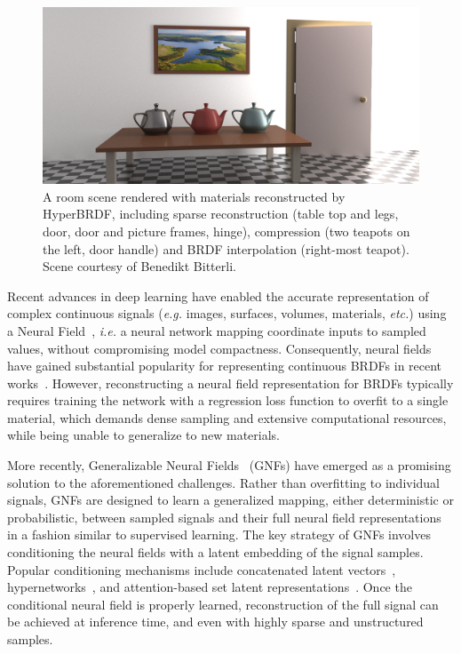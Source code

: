 \begin{figure}
  \centering
   \includegraphics[width=\linewidth]{Chapters/hyperbrdf-figs/teaser_cropped.png}
   \caption{A room scene rendered with materials reconstructed by HyperBRDF, including sparse reconstruction (table top and legs, door, door and picture frames, hinge), compression (two teapots on the left, door handle) and BRDF interpolation (right-most teapot). Scene courtesy of Benedikt Bitterli.}
   \label{fig:teaser}
\end{figure}

Recent advances in deep learning have enabled the accurate representation of complex continuous signals (\textit{e.g.} images, surfaces, volumes, materials, \textit{etc.}) using a Neural Field~\cite{sitzmann2020siren, ffn, cnf2023}, \textit{i.e.} a neural network mapping coordinate inputs to sampled values, without compromising model compactness. Consequently, neural fields have gained substantial popularity for representing continuous BRDFs in recent works~\cite{sztrajman2021neural, cnf2023}. However, reconstructing a neural field representation for BRDFs typically requires training the network with a regression loss function to overfit to a single material, which demands dense sampling and extensive computational resources, while being unable to generalize to new materials.

More recently, Generalizable Neural Fields~\cite{rebain2022attention} (GNFs) have emerged as a promising solution to the aforementioned challenges. Rather than overfitting to individual signals, GNFs are designed to learn a generalized mapping, either deterministic or probabilistic, between sampled signals and their full neural field representations in a fashion similar to supervised learning.
The key strategy of GNFs involves conditioning the neural fields with a latent embedding of the signal samples. Popular conditioning mechanisms include concatenated latent vectors~\cite{park2019deepsdf}, hypernetworks~\cite{ha2017hypernetworks}, and attention-based set latent representations~\cite{jiang2021cotr}. Once the conditional neural field is properly learned, reconstruction of the full signal can be achieved at inference time, and even with highly sparse and unstructured samples.


